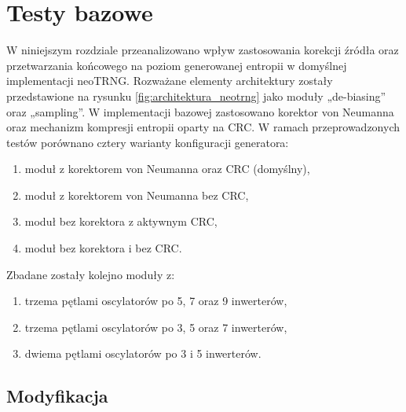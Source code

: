 
\chapter{Testy bazowe}

\noindent W niniejszym rozdziale przeanalizowano wpływ zastosowania korekcji źródła oraz 
przetwarzania końcowego na poziom generowanej entropii w domyślnej implementacji 
neoTRNG. Rozważane elementy architektury zostały przedstawione na rysunku 
\ref{fig:architektura_neotrng} jako moduły „de-biasing” oraz „sampling”. W 
implementacji bazowej zastosowano korektor von Neumanna oraz mechanizm kompresji 
entropii oparty na CRC. W ramach przeprowadzonych testów porównano cztery 
warianty konfiguracji generatora:

\begin{enumerate}
    \item moduł z korektorem von Neumanna oraz CRC (domyślny),
    \item moduł z korektorem von Neumanna bez CRC,
    \item moduł bez korektora z aktywnym CRC,
    \item moduł bez korektora i bez CRC.
\end{enumerate}

Zbadane zostały kolejno moduły z:

\begin{enumerate}
    \item trzema pętlami oscylatorów po 5, 7 oraz 9 inwerterów,
    \item trzema pętlami oscylatorów po 3, 5 oraz 7 inwerterów,
    \item dwiema pętlami oscylatorów po 3 i 5 inwerterów.
\end{enumerate}

\section{Modyfikacja}

